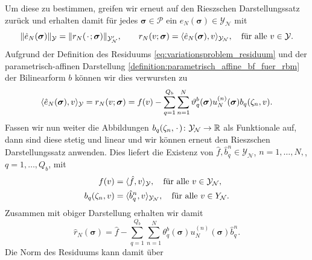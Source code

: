 \documentclass[../main.tex]{subfiles}
\begin{document}
Um diese zu bestimmen, greifen wir erneut auf den Rieszschen Darstellungssatz zurück und erhalten damit für jedes $\bm \sigma \in \mathcal P$ ein $\hat{e}_{N}(\bm \sigma) \in \mathcal Y_{\mathcal N}$ mit
\begin{equation}
    \norm{\hat{e}_{N}(\bm \sigma)}_{\mathcal Y} = \norm{r_{N}(\blank; \bm \sigma)}_{\mathcal Y_{\mathcal N}'}, \qquad
    r_{N}(v; \bm \sigma) = \skp{\hat{e}_{N}(\bm \sigma)}{v}{\mathcal Y_{\mathcal N}}, \quad \fa v \in \mathcal Y.
\end{equation}
Aufgrund der Definition des Residuums \cref{eq:variationsproblem_residuum} und der parametrisch-affinen Darstellung \cref{definition:parametrisch_affine_bf_fuer_rbm} der Bilinearform $b$ können wir dies verwursten zu
\begin{equation}
    \skp{\hat{e}_{N}(\bm \sigma)}{v}{\mathcal Y}
    = r_{N}(v; \bm \sigma)
    = f(v) - \sum_{q = 1}^{Q_b} \sum_{n = 1}^{N} \theta_{q}^{b}(\bm \sigma) u^{(n)}_{N}(\bm \sigma) b_{q}(\zeta_{n}, v).
\end{equation}
Fassen wir nun weiter die Abbildungen $b_{q}(\zeta_{n}, \blank) \colon \mathcal Y_{\mathcal N} \to \mathbb{R}$ als Funktionale auf, dann sind diese stetig und linear und wir können erneut den Rieszschen Darstellungssatz anwenden.
Dies liefert die Existenz von $\hat{f}, \hat{b}^{n}_{q} \in \mathcal Y_{\mathcal N}$, $n = 1, \dots, N,$, $q = 1, \dots, Q_b$, mit
\begin{equation}
    \begin{aligned}
        f(v) &= \skp{\hat{f}}{v}{\mathcal Y}, \quad \fa v \in \mathcal Y_{\mathcal N},
        \\
        b_{q}(\zeta_{n}, v) &= \skp{\hat{b}^{n}_{q}}{v}{\mathcal Y_{\mathcal N}}, \quad \fa v \in \mathcal \mathcal Y_{\mathcal N}.
    \end{aligned}
\end{equation}
Zusammen mit obiger Darstellung erhalten wir damit
\begin{equation}
    \hat{r}_{N}(\bm \sigma) = \hat{f} - \sum_{q = 1}^{Q_b} \sum_{n = 1}^{N} \theta_{q}^{b}(\bm \sigma) u_{N}^{(n)}(\bm \sigma) \hat{b}^{n}_{q}.
\end{equation}
Die Norm des Residuums kann damit über
\end{document}
